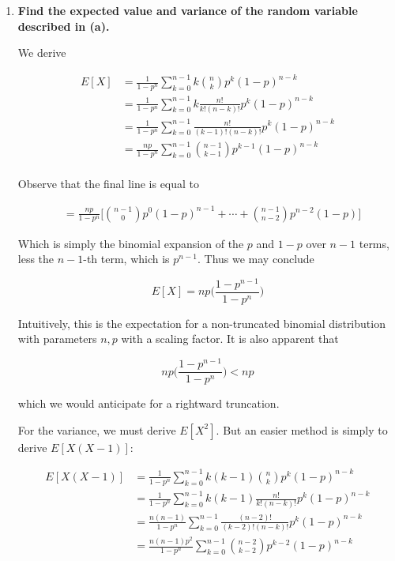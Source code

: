 \documentclass[10pt, oneside]{article}   	%
\theoremstyle{definition}
\begin{document}
\begin{enumerate}[label=9.\arabic*]
\begin{enumerate}
	\item  \begin{tcolorbox}[
	  colback=Cerulean!5!white,
	  colframe=Cerulean!75!black]
	\textbf{Find the expected value and variance of the random variable described in (a).}
	\end{tcolorbox}
	
	We derive
	
	\begin{align*}
	E[X] &= \frac{1}{1-p^n} \sum^{n-1}_{k=0} k \binom{n}{k} p^k (1-p)^{n-k} \\
	&= \frac{1}{1-p^n} \sum^{n-1}_{k=0} k \frac{n!}{k! (n-k)!} p^k (1-p)^{n-k} \\
	&= \frac{1}{1-p^n} \sum^{n-1}_{k=0} \frac{n!}{(k-1)! (n-k)!} p^k (1-p)^{n-k} \\
	&= \frac{np}{1-p^n} \sum^{n-1}_{k=0} \binom{n-1}{k-1} p^{k-1} (1-p)^{n-k} \\
	\end{align*}
	
	Observe that the final line is equal to
	
	\begin{align*}
	&= \frac{np}{1-p^n} \bigg[ \binom{n-1}{0} p^0 (1-p)^{n-1} + \cdots + \binom{n-1}{n-2} p^{n-2} (1-p) \bigg]
	\end{align*}
	
	Which is simply the binomial expansion of the $p$ and $1-p$ over $n-1$ terms, less the $n-1$-th term, which is $p^{n-1}$. Thus we may conclude
	
	\[ \boxed{ E[X] = np \bigg( \frac{1-p^{n-1}}{1-p^n} \bigg) } \]
	
	Intuitively, this is the expectation for a non-truncated binomial distribution with parameters $n, p$ with a scaling factor. It is also apparent that
	
	\[ np \bigg( \frac{1-p^{n-1}}{1-p^n} \bigg)  < np \]
	
	which we would anticipate for a rightward truncation. 
	
	For the variance, we must derive $E[X^2]$. But an easier method is simply to derive $E[X(X-1)]$:
	
	\begin{align*}
	E[X(X-1)] &= \frac{1}{1-p^n} \sum^{n-1}_{k=0} k(k-1) \binom{n}{k} p^k (1-p)^{n-k} \\
	&= \frac{1}{1-p^n} \sum^{n-1}_{k=0} k(k-1) \frac{n!}{k! (n-k)!} p^k (1-p)^{n-k} \\
	&= \frac{n(n-1)}{1-p^n} \sum^{n-1}_{k=0} \frac{(n-2)!}{(k-2)! (n-k)!} p^k (1-p)^{n-k} \\
	&= \frac{n(n-1)p^2}{1-p^n} \sum^{n-1}_{k=0} \binom{n-2}{k-2} p^{k-2} (1-p)^{n-k}
	\end{align*}
	

\end{enumerate}
\end{enumerate}
\end{document}
